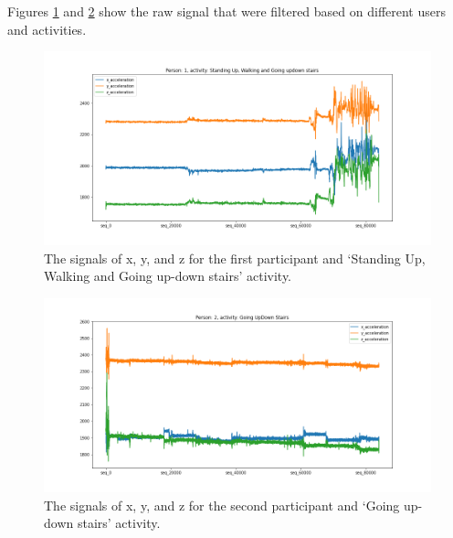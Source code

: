 Figures \ref{fig:Ass3_Q3_raw_signal} and \ref{fig:Ass3_Q2_raw_signal} show the raw signal that were filtered based on different users and activities.

\begin{figure}[H]
    \centering
    \begin{minipage}[b]{1\textwidth}
        \includegraphics[width=\textwidth]{manuscript/src/figures/Ass3/Ass3_Q3_raw_signal.png}
    \end{minipage}
    \caption{The signals of x, y, and z for the first participant and ‘Standing  Up,  Walking  and  Going  up-down  stairs’ activity.}
    \label{fig:Ass3_Q3_raw_signal}
\end{figure}
\begin{figure}[H]
    \centering
    \begin{minipage}[b]{1\textwidth}
        \includegraphics[width=\textwidth]{manuscript/src/figures/Ass3/Ass3_Q2_raw_signal.png}
    \end{minipage}
    \caption{The signals of x, y, and z for the second participant and ‘Going  up-down  stairs’ activity.}
    \label{fig:Ass3_Q2_raw_signal}
\end{figure}

